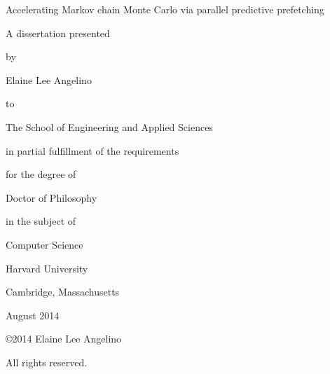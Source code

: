\newpage
\setcounter{page}{1}
\begin{spacing}{2}

\begin{center}
\end{center}

\begin{center}
\end{center}


\begin{center}
Accelerating Markov chain Monte Carlo via parallel predictive prefetching \\
\end{center}


\begin{center}
A dissertation presented

by

Elaine Lee Angelino

to

The School of Engineering and Applied Sciences \\
\end{center}


\begin{center}
in partial fulfillment of the requirements

for the degree of

Doctor of Philosophy

in the subject of

Computer Science \\
\end{center}


\begin{center}
Harvard University

Cambridge, Massachusetts \\
\end{center}


\begin{center}
August 2014
\end{center}

\end{spacing}

\thispagestyle{empty}
\pagestyle{empty}


\newpage

\null
\vfill

\copyright 2014 Elaine Lee Angelino

All rights reserved.

\thispagestyle{empty}
\pagestyle{empty}



